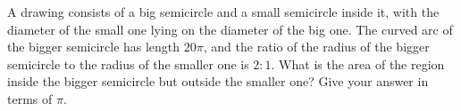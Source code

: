 A drawing consists of a big semicircle and a small semicircle inside it, with the diameter of the small one lying on the diameter of the big one. The curved arc of the bigger semicircle has length $20\pi$, and the ratio of the radius of the bigger semicircle to the radius of the smaller one is $2:1$. What is the area of the region inside the bigger semicircle but outside the smaller one? Give your answer in terms of $\pi$.
